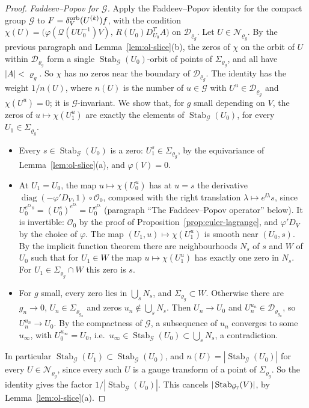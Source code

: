 \begin{proof}
\emph{Faddeev--Popov for $\mathcal G$.} Apply the Faddeev--Popov identity for the compact group $\mathcal G$ to $F=\delta^{\rm orb}_V(U^{(k)})f$, with the condition $\chi(U)=\big(\varphi(\mathcal Q(UU_0^{-1})V),\,R(U_0)D^T_{U_0}A\big)$ on $\mathcal D_{\varrho_g}$. Let $U\in\mathscr N_{\varrho_g}$. By the previous paragraph and Lemma~\ref{lem:ol-slice}(b), the zeros of $\chi$ on the orbit of $U$ within $\mathcal D_{\varrho_g}$ form a single $\operatorname{Stab}_{\mathcal G}(U_0)$-orbit of points of $\Sigma_{\varrho_g}$, and all have $|A|<\varrho_g$. So $\chi$ has no zeros near the boundary of $\mathcal D_{\varrho_g}$. The identity has the weight $1/n(U)$, where $n(U)$ is the number of $u\in\mathcal G$ with $U^u\in\mathcal D_{\varrho_g}$ and $\chi(U^u)=0$; it is $\mathcal G$-invariant. We show that, for $g$ small depending on $V$, the zeros of $u\mapsto\chi(U_1^u)$ are exactly the elements of $\operatorname{Stab}_{\mathcal G}(U_0)$, for every $U_1\in\Sigma_{\varrho_g}$.
\begin{itemize}
\item Every $s\in\operatorname{Stab}_{\mathcal G}(U_0)$ is a zero: $U_1^s\in\Sigma_{\varrho_g}$, by the equivariance of Lemma~\ref{lem:ol-slice}(a), and $\varphi(V)=0$.
\item At $U_1=U_0$, the map $u\mapsto\chi(U_0^u)$ has at $u=s$ the derivative $\operatorname{diag}(-\varphi'D_V,1)\circ\mathcal O_0$, composed with the right translation $\lambda\mapsto e^{\ii\lambda}s$, since $U_0^{e^{\ii\lambda}s}=(U_0^s)^{e^{\ii\lambda}}=U_0^{e^{\ii\lambda}}$ (paragraph ``The Faddeev--Popov operator'' below). It is invertible: $\mathcal O_0$ by the proof of Proposition~\ref{prop:euler-lagrange}, and $\varphi'D_V$ by the choice of $\varphi$. The map $(U_1,u)\mapsto\chi(U_1^u)$ is smooth near $(U_0,s)$. By the implicit function theorem there are neighbourhoods $N_s$ of $s$ and $W$ of $U_0$ such that for $U_1\in W$ the map $u\mapsto\chi(U_1^u)$ has exactly one zero in $N_s$. For $U_1\in\Sigma_{\varrho_g}\cap W$ this zero is $s$.
\item For $g$ small, every zero lies in $\bigcup_sN_s$, and $\Sigma_{\varrho_g}\subset W$. Otherwise there are $g_n\to0$, $U_n\in\Sigma_{\varrho_{g_n}}$ and zeros $u_n\notin\bigcup_sN_s$. Then $U_n\to U_0$ and $U_n^{u_n}\in\mathcal D_{\varrho_{g_n}}$, so $U_n^{u_n}\to U_0$. By the compactness of $\mathcal G$, a subsequence of $u_n$ converges to some $u_\infty$, with $U_0^{u_\infty}=U_0$, i.e.\ $u_\infty\in\operatorname{Stab}_{\mathcal G}(U_0)\subset\bigcup_sN_s$, a contradiction.
\end{itemize}
In particular $\operatorname{Stab}_{\mathcal G}(U_1)\subset\operatorname{Stab}_{\mathcal G}(U_0)$, and $n(U)=|\operatorname{Stab}_{\mathcal G}(U_0)|$ for every $U\in\mathscr N_{\varrho_g}$, since every such $U$ is a gauge transform of a point of $\Sigma_{\varrho_g}$. So the identity gives the factor $1/|\operatorname{Stab}_{\mathcal G}(U_0)|$. This cancels $|\operatorname{Stab}_{\mathcal G_\mathbb T}(V)|$, by Lemma~\ref{lem:ol-slice}(a).


\end{proof}
